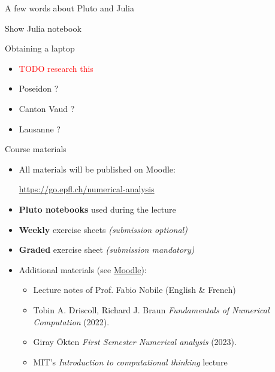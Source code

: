 \begin{frame}{A few words about Pluto and Julia}
    \begin{center}
        \Large{Show Julia notebook}
    \end{center}
\end{frame}

\begin{frame}{Obtaining a laptop}
    \begin{itemize}
        \item \textcolor{red}{TODO research this}
        \item Poseidon ?
        \item Canton Vaud ?
        \item Lausanne ?
    \end{itemize}
\end{frame}


\begin{frame}{Course materials}
    \begin{itemize}
        \item All materials will be published on \alert{Moodle:}
            \begin{center}
            \url{https://go.epfl.ch/numerical-analysis}
            \end{center}
        \vspace{1em}
        \item \textbf{Pluto notebooks} used during the lecture
        \item \textbf{Weekly} exercise sheets \textit{(submission optional)}
        \item \textbf{Graded} exercise sheet \textit{(submission mandatory)}
        \vspace{1em}
        \item Additional materials (see \href{https://go.epfl.ch/numerical-analysis}{Moodle}):
            \begin{itemize}
                \item Lecture notes of Prof. Fabio Nobile (English \& French)
                \item Tobin A. Driscoll, Richard J. Braun
                    \textit{Fundamentals of Numerical Computation} (2022).
                \item Giray Ökten \textit{First Semester Numerical analysis} (2023).
                \item MIT's \textit{Introduction to computational thinking} lecture
            \end{itemize}
    \end{itemize}
\end{frame}

